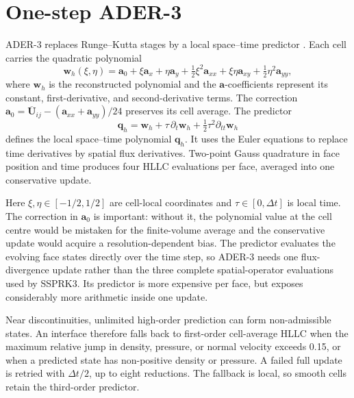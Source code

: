 \section{One-step ADER-3}

ADER-3 replaces Runge--Kutta stages by a local space--time predictor \cite{dumbser2008}. Each cell carries the quadratic polynomial
\begin{equation}
\mathbf w_h(\xi,\eta)=\mathbf a_0+\xi\mathbf a_x+\eta\mathbf a_y
+\tfrac12\xi^2\mathbf a_{xx}+\xi\eta\mathbf a_{xy}
+\tfrac12\eta^2\mathbf a_{yy},
\end{equation}
where \(\mathbf w_h\) is the reconstructed polynomial and the
\(\mathbf a\)-coefficients represent its constant, first-derivative, and
second-derivative terms. The correction
\(\mathbf a_0=\overline{\mathbf U}_{ij}-(\mathbf a_{xx}+\mathbf a_{yy})/24\)
preserves its cell average. The predictor
\begin{equation}
\mathbf q_h=\mathbf w_h+\tau\,\partial_t\mathbf w_h
+\tfrac12\tau^2\partial_{tt}\mathbf w_h
\label{eq:aderpredictor}
\end{equation}
defines the local space--time polynomial \(\mathbf q_h\). It uses the Euler
equations to replace time derivatives by spatial flux derivatives. Two-point
Gauss quadrature in face position and time produces four HLLC evaluations per
face, averaged into one conservative update.

Here \(\xi,\eta\in[-1/2,1/2]\) are cell-local coordinates and \(\tau\in[0,\Delta t]\) is local time. The correction in \(\mathbf a_0\) is important: without it, the polynomial value at the cell centre would be mistaken for the finite-volume average and the conservative update would acquire a resolution-dependent bias. The predictor evaluates the evolving face states directly over the time step, so ADER-3 needs one flux-divergence update rather than the three complete spatial-operator evaluations used by SSPRK3. Its predictor is more expensive per face, but exposes considerably more arithmetic inside one update.

Near discontinuities, unlimited high-order prediction can form non-admissible states. An interface therefore falls back to first-order cell-average HLLC when the maximum relative jump in density, pressure, or normal velocity exceeds 0.15, or when a predicted state has non-positive density or pressure. A failed full update is retried with \(\Delta t/2\), up to eight reductions. The fallback is local, so smooth cells retain the third-order predictor.

